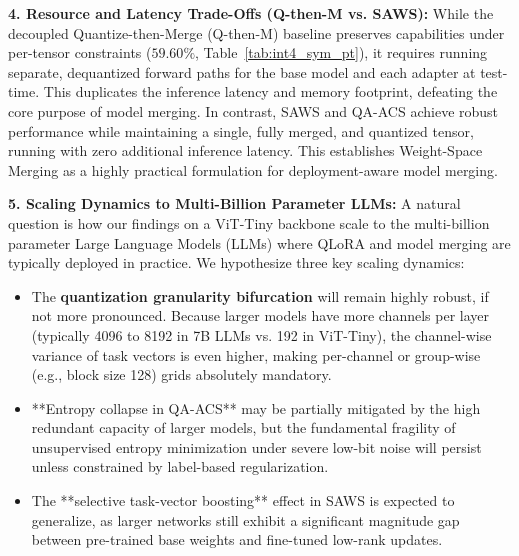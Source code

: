 \textbf{4. Resource and Latency Trade-Offs (Q-then-M vs. SAWS):}
While the decoupled Quantize-then-Merge (Q-then-M) baseline preserves capabilities under per-tensor constraints ($59.60\%$, Table~\ref{tab:int4_sym_pt}), it requires running separate, dequantized forward paths for the base model and each adapter at test-time. This duplicates the inference latency and memory footprint, defeating the core purpose of model merging. In contrast, SAWS and QA-ACS achieve robust performance while maintaining a single, fully merged, and quantized tensor, running with zero additional inference latency. This establishes Weight-Space Merging as a highly practical formulation for deployment-aware model merging.

\textbf{5. Scaling Dynamics to Multi-Billion Parameter LLMs:}
A natural question is how our findings on a ViT-Tiny backbone scale to the multi-billion parameter Large Language Models (LLMs) where QLoRA and model merging are typically deployed in practice. We hypothesize three key scaling dynamics:
\begin{itemize}
  \item The \textbf{quantization granularity bifurcation} will remain highly robust, if not more pronounced. Because larger models have more channels per layer (typically 4096 to 8192 in 7B LLMs vs. 192 in ViT-Tiny), the channel-wise variance of task vectors is even higher, making per-channel or group-wise (e.g., block size 128) grids absolutely mandatory.
  \item **Entropy collapse in QA-ACS** may be partially mitigated by the high redundant capacity of larger models, but the fundamental fragility of unsupervised entropy minimization under severe low-bit noise will persist unless constrained by label-based regularization.
  \item The **selective task-vector boosting** effect in SAWS is expected to generalize, as larger networks still exhibit a significant magnitude gap between pre-trained base weights and fine-tuned low-rank updates.
\end{itemize}

